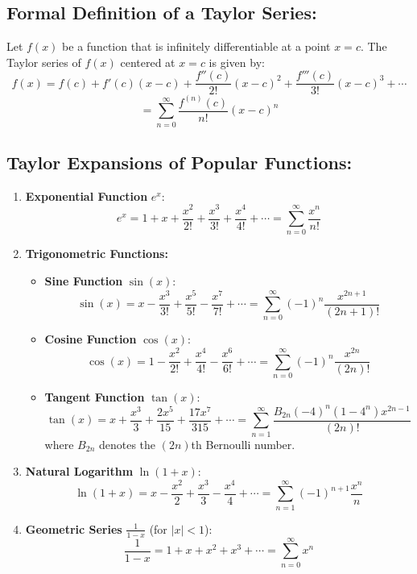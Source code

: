 \subsection*{Formal Definition of a Taylor Series:}
Let \( f(x) \) be a function that is infinitely differentiable at a point \( x = c \). The Taylor series of \( f(x) \) centered at \( x = c \) is given by:
\[ f(x) = f(c) + f'(c)(x-c) + \frac{f''(c)}{2!}(x-c)^2 + \frac{f'''(c)}{3!}(x-c)^3 + \cdots \]
\[ = \sum_{n=0}^{\infty} \frac{f^{(n)}(c)}{n!}(x-c)^n \]

\subsection*{Taylor Expansions of Popular Functions:}
\begin{enumerate}
    \item \textbf{Exponential Function} \( e^x \):
    \[ e^x = 1 + x + \frac{x^2}{2!} + \frac{x^3}{3!} + \frac{x^4}{4!} + \cdots = \sum_{n=0}^{\infty} \frac{x^n}{n!} \]
    
    \item \textbf{Trigonometric Functions:}
       \begin{itemize}
            \item \textbf{Sine Function} \( \sin(x) \):
            \[ \sin(x) = x - \frac{x^3}{3!} + \frac{x^5}{5!} - \frac{x^7}{7!} + \cdots = \sum_{n=0}^{\infty} (-1)^n \frac{x^{2n+1}}{(2n+1)!} \]
            
            \item \textbf{Cosine Function} \( \cos(x) \):
            \[ \cos(x) = 1 - \frac{x^2}{2!} + \frac{x^4}{4!} - \frac{x^6}{6!} + \cdots = \sum_{n=0}^{\infty} (-1)^n \frac{x^{2n}}{(2n)!} \]

            \item \textbf{Tangent Function} \( \tan(x) \):
    \[ \tan(x) = x + \frac{x^3}{3} + \frac{2x^5}{15} + \frac{17x^7}{315} + \cdots = \sum_{n=1}^{\infty} \frac{B_{2n}(-4)^n(1-4^n)x^{2n-1}}{(2n)!} \]
    where \( B_{2n} \) denotes the \( (2n) \)th Bernoulli number.
       \end{itemize}

       
       
    \item \textbf{Natural Logarithm} \( \ln(1+x) \):
    \[ \ln(1+x) = x - \frac{x^2}{2} + \frac{x^3}{3} - \frac{x^4}{4} + \cdots = \sum_{n=1}^{\infty} (-1)^{n+1} \frac{x^n}{n} \]
    
    \item \textbf{Geometric Series} \( \frac{1}{1-x} \) (for \( |x| < 1 \)):
    \[ \frac{1}{1-x} = 1 + x + x^2 + x^3 + \cdots = \sum_{n=0}^{\infty} x^n \]
    
    
\end{enumerate}


